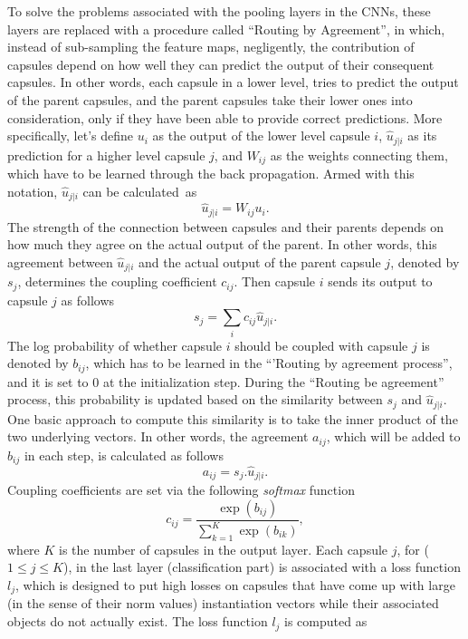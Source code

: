 \documentclass{article}
\begin{document}
To solve the problems associated with the pooling layers in the CNNs, these layers are replaced with a procedure called ``Routing by Agreement'', in which, instead of sub-sampling the feature maps, negligently, the contribution of capsules depend on how well they can predict the output of their consequent capsules. In other words, each capsule in a lower level, tries to predict the output of the parent capsules, and the parent capsules take their lower ones into consideration, only if they have been able to provide correct predictions. More specifically, let's define ${u_{i}}$ as the output of the lower level capsule $i$, $\hat{u}_{j|i}$ as its prediction for a higher level capsule $j$, and $W_{ij}$ as the weights connecting them, which have to be learned through the back propagation. Armed with this notation, $\hat{u}_{j|i}$ can be calculated~as
%
\begin{equation}
\hat{u}_{j|i}=W_{ij}u_i.
\end{equation}
%
The strength of the connection between capsules and their parents depends on how much they agree on the actual output of the parent. In other words, this agreement between $\hat{u}_{j|i}$ and the actual output of the parent capsule $j$, denoted by $s_j$, determines the coupling coefficient $c_{ij}$. Then capsule $i$ sends its output to capsule $j$ as follows
%
\begin{equation}
s_j=\sum_ic_{ij}\hat{u}_{j|i}.
\end{equation}
%
The log probability of whether capsule $i$ should be coupled with capsule $j$ is denoted by $b_{ij}$, which has to be learned in the ``'Routing by agreement process'', and it is set to $0$ at the initialization step. During the ``Routing be agreement'' process, this probability is updated based on the similarity between $s_j$ and $\hat{u}_{j|i}$. One basic approach to compute this similarity is to take the inner product of the two underlying vectors. In other words, the agreement $a_{ij}$, which will be added to $b_{ij}$ in each step, is calculated as follows
%
\begin{equation}
a_{ij}=s_j.\hat{u}_{j|i}.
\end{equation}
%
Coupling coefficients are set via the following \textit{softmax} function
%
\begin{equation}
c_{ij}=\frac{\exp(b_{ij})}{\sum_{k=1}^{K} \exp(b_{ik})},
\end{equation}
%
where $K$ is the number of capsules in the output layer. Each capsule $j$, for ($1 \leq j \leq K$), in the last layer (classification part) is associated with a loss function $l_j$, which is designed to put high losses on capsules that have come up with large (in the sense of their norm values) instantiation vectors while their associated objects do not actually exist. The  loss function $l_j$ is computed as
\end{document}
